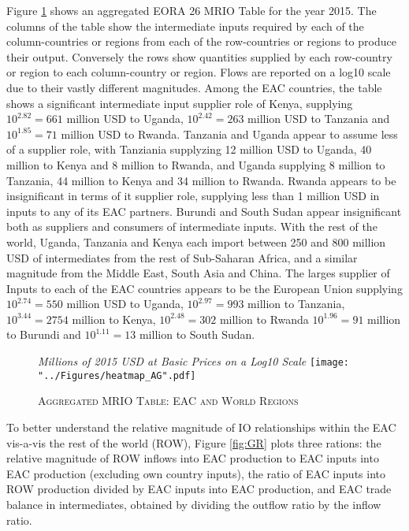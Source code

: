 \documentclass[a4paper]{article}
\begin{document}
Figure \ref{fig:wld} shows an aggregated EORA 26 MRIO Table for the year 2015.  The columns of the table show the intermediate inputs required by each of the column-countries or regions from each of the row-countries or regions to produce their output. Conversely the rows show quantities supplied by each row-country or region to each column-country or region. Flows are reported on a log10 scale due to their vastly different magnitudes. Among the EAC countries, the table shows a significant intermediate input supplier role of Kenya, supplying $10^{2.82} = 661$ million USD to Uganda, $10^{2.42} = 263$ million USD to Tanzania and  $10^{1.85} = 71$ million USD to Rwanda. Tanzania and Uganda appear to assume less of a supplier role, with Tanziania supplyzing 12 million USD to Uganda, 40 million to Kenya and 8 million to Rwanda, and Uganda supplying 8 million to Tanzania, 44 million to Kenya and 34 million to Rwanda. Rwanda appears to be insignificant in terms of it supplier role, supplying less than 1 million USD in inputs to any of its EAC partners. Burundi and South Sudan appear insignificant both as suppliers and consumers of intermediate inputs. With the rest of the world, Uganda, Tanzania and Kenya each import between 250 and 800 million USD of intermediates from the rest of Sub-Saharan Africa, and a similar magnitude from the Middle East, South Asia and China. The larges supplier of Inputs to each of the EAC countries appears to be the European Union supplying $10^{2.74} = 550$ million USD to Uganda, $10^{2.97} = 993$ million to Tanzania, $10^{3.44} = 2754$ million to Kenya, $10^{2.48} = 302$ million to Rwanda  $10^{1.96} = 91$ million to Burundi and $10^{1.11} = 13$ million to South Sudan. 

\begin{figure}[h!]
\centering
\caption{\label{fig:wld}\textsc{Aggregated MRIO Table: EAC and World Regions}}
\small{\textit{Millions of 2015 USD at Basic Prices on a Log10 Scale}}
\texttt{[image: "../Figures/heatmap\_AG".pdf]} %
\end{figure}
\FloatBarrier


To better understand the relative magnitude of IO relationships within the EAC vis-a-vis the rest of the world (ROW), Figure \ref{fig:GR} plots three rations: the relative magnitude of ROW inflows into EAC production to EAC inputs into EAC production (excluding own country inputs), the ratio of EAC inputs into ROW production divided by EAC inputs into EAC production, and EAC trade balance in intermediates, obtained by dividing the outflow ratio by the inflow ratio. 
\end{document}
